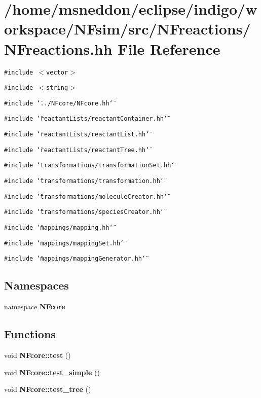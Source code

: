 \section{/home/msneddon/eclipse/indigo/workspace/NFsim/src/NFreactions/NFreactions.hh File Reference}
\label{NFreactions_8hh}


{\tt \#include $<$vector$>$}\par
{\tt \#include $<$string$>$}\par
{\tt \#include \char`\"{}../NFcore/NFcore.hh\char`\"{}}\par
{\tt \#include \char`\"{}reactantLists/reactantContainer.hh\char`\"{}}\par
{\tt \#include \char`\"{}reactantLists/reactantList.hh\char`\"{}}\par
{\tt \#include \char`\"{}reactantLists/reactantTree.hh\char`\"{}}\par
{\tt \#include \char`\"{}transformations/transformationSet.hh\char`\"{}}\par
{\tt \#include \char`\"{}transformations/transformation.hh\char`\"{}}\par
{\tt \#include \char`\"{}transformations/moleculeCreator.hh\char`\"{}}\par
{\tt \#include \char`\"{}transformations/speciesCreator.hh\char`\"{}}\par
{\tt \#include \char`\"{}mappings/mapping.hh\char`\"{}}\par
{\tt \#include \char`\"{}mappings/mappingSet.hh\char`\"{}}\par
{\tt \#include \char`\"{}mappings/mappingGenerator.hh\char`\"{}}\par
\subsection*{Namespaces}
\begin{CompactItemize}
\item 
namespace {\bf NFcore}
\end{CompactItemize}
\subsection*{Functions}
\begin{CompactItemize}
\item 
void {\bf NFcore::test} ()
\item 
void {\bf NFcore::test\_\-simple} ()
\item 
void {\bf NFcore::test\_\-tree} ()
\end{CompactItemize}
